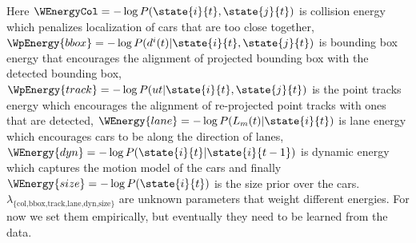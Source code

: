 Here $\WEnergyCol = -\log P(\state{i}{t}, \state{j}{t})$ is collision energy which penalizes localization of cars that are too close together, $\WpEnergy{bbox} = -\log P(\bb{i} | \state{i}{t}, \state{j}{t})$ is bounding box energy that encourages the alignment of projected bounding box with the detected bounding box, $\WpEnergy{track} = -\log P(\trackp{t} | \state{i}{t}, \state{j}{t})$ is the point tracks energy which encourages the alignment of re-projected point tracks with ones that are detected, $\WEnergy{lane} = - \log P(L_m(t) | \state{i}{t})$ is lane energy which encourages cars to be along the direction of lanes, $\WEnergy{dyn} = - \log P( \state{i}{t} | \state{i}{t-1} ) $ is dynamic energy which captures the motion model of the cars and finally $\WEnergy{size} = - \log P (\state{i}{t})$ is the size prior over the cars. $\lambda_{\text{\{col,bbox,track,lane,dyn,size\}}}$ are unknown parameters that weight different energies. For now we set them empirically, but eventually they need to be learned from the data.
